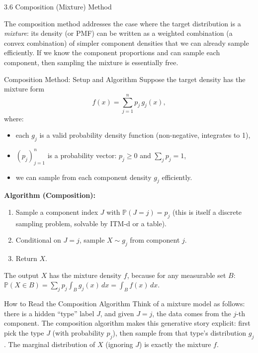 \documentclass[aspectratio=169,10pt]{beamer}
\newcommand{\PP}{\mathbb{P}}
\begin{document}
\begin{frame}[allowframebreaks]{3.6 Composition (Mixture) Method}

The composition method addresses the case where the target distribution is a
\emph{mixture}: its density (or PMF) can be written as a weighted combination
(a convex combination) of simpler component densities that we can already sample
efficiently.  If we know the component proportions and can sample each component,
then sampling the mixture is essentially free.

\begin{block}{Composition Method: Setup and Algorithm}
  Suppose the target density has the mixture form
  \[
    f(x) = \sum_{j=1}^{n} p_j\, g_j(x),
  \]
  where:
  \begin{itemize}
    \item each $g_j$ is a valid probability density function (non-negative,
      integrates to 1),
    \item $(p_j)_{j=1}^n$ is a probability vector: $p_j \ge 0$ and $\sum_j p_j = 1$,
    \item we can sample from each component density $g_j$ efficiently.
  \end{itemize}

  \textbf{Algorithm (Composition):}
  \begin{enumerate}
    \item Sample a component index $J$ with $\PP(J = j) = p_j$
          (this is itself a discrete sampling problem, solvable by ITM-d or a table).
    \item Conditional on $J = j$, sample $X \sim g_j$ from component $j$.
    \item Return $X$.
  \end{enumerate}

  The output $X$ has the mixture density $f$, because for any measurable set $B$:
  $\PP(X \in B) = \sum_j p_j \int_B g_j(x)\,dx = \int_B f(x)\,dx$.
\end{block}

\begin{alertblock}{How to Read the Composition Algorithm}
  Think of a mixture model as follows: there is a hidden ``type'' label $J$,
  and given $J = j$, the data comes from the $j$-th component.  The composition
  algorithm makes this generative story explicit: first pick the type $J$
  (with probability $p_j$), then sample from that type's distribution $g_j$.
  The marginal distribution of $X$ (ignoring $J$) is exactly the mixture $f$.
\end{alertblock}


\end{frame}
\end{document}

